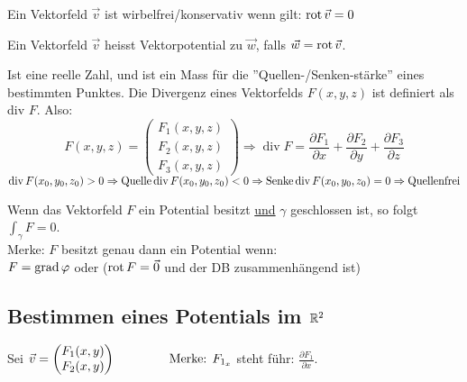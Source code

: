 \begin{definition}
Ein Vektorfeld $\vec{v}$ ist wirbelfrei/konservativ wenn gilt: $\operatorname{rot} \vec{v} = 0$
\end{definition}

\begin{definition}[Vektorpotential]
Ein Vektorfeld $\vec{v}$ heisst Vektorpotential zu $\vec{w}$, falls $\vec{w} = \operatorname{rot} \vec{v}$.
\end{definition}

\begin{definition}[Divergenz]
Ist eine reelle Zahl, und ist ein Mass für die ''Quellen-/Senken-stärke'' eines bestimmten Punktes. 
Die Divergenz eines Vektorfelds $F(x, y, z)$ ist definiert als div $F$. Also:
\[
F(x, y, z) = 
\left(
	\begin{array}{c}
		F_1 (x, y, z) \\
		F_2 (x, y, z) \\
		F_3 (x, y, z)
	\end{array}
\right) \Rightarrow
	\operatorname{div} F = \frac{\partial F_1}{\partial x} + \frac{\partial F_2}{\partial y} + 
	\frac{\partial F_3}{\partial z}
\] 
$
\operatorname{div} F(x_0, y_0, z_0) > 0 \Rightarrow \text{Quelle}\\
\operatorname{div} F(x_0, y_0, z_0) < 0 \Rightarrow \text{Senke}\\
\operatorname{div} F(x_0, y_0, z_0) = 0 \Rightarrow \text{Quellenfrei}
$
\end{definition}

\begin{lemma}
Wenn das Vektorfeld $F$ ein Potential besitzt \uline{und} $\gamma$ geschlossen ist, so folgt $\int_\gamma F = 0$.\\
Merke: $F$ besitzt genau dann ein Potential wenn:\\
$F = \operatorname{grad} \varphi$ oder ($\operatorname{rot} F = \vec{0}$ und der DB zusammenhängend ist)
\end{lemma}

\pagebreak
\subsection{Bestimmen eines Potentials im $\mathbb{R}^2$}
Sei $\vec{v} = \begin{pmatrix}
F_1(x,y)\\
F_2(x,y)
\end{pmatrix} \hspace{1.5cm} \text{Merke: } F_{1_x}$ steht führ: $\frac{\partial F_1}{\partial x}$.

